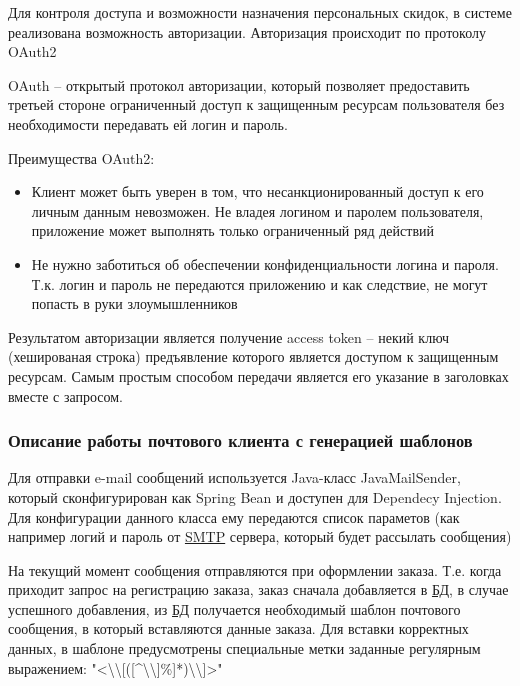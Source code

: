 Для контроля доступа и возможности назначения персональных скидок, в системе реализована возможность авторизации. Авторизация происходит по протоколу OAuth2


OAuth – открытый протокол авторизации, который позволяет предоставить третьей стороне ограниченный доступ к защищенным ресурсам пользователя без необходимости передавать ей логин и пароль.

Преимущества OAuth2:
\begin{itemize}
    \item Клиент может быть уверен в том, что несанкционированный доступ к его личным данным невозможен.
    Не владея логином и паролем пользователя, приложение может выполнять только ограниченный ряд действий
    \item Не нужно заботиться об обеспечении конфиденциальности логина и пароля.
    Т.к. логин и пароль не передаются приложению и как следствие, не могут попасть в руки злоумышленников
\end{itemize}

Результатом авторизации является получение access token – некий ключ (хешированая строка) предъявление которого является доступом к защищенным ресурсам.
Самым простым способом передачи является его указание в заголовках вместе с запросом.

\subsubsection{Описание работы почтового клиента с генерацией шаблонов}\indent

Для отправки e-mail сообщений используется Java-класс JavaMailSender, который сконфигурирован как Spring Bean и доступен для Dependecy Injection.
Для конфигурации данного класса ему передаются список параметов (как например логий и пароль от \hyperlink{gloss:smtp}{SMTP} сервера, который будет рассылать сообщения)

На текущий момент сообщения отправляются при оформлении заказа.
Т.е. когда приходит запрос на регистрацию заказа, заказ сначала добавляется в \hyperlink{gloss:db}{БД}, в случае успешного добавления, из \hyperlink{gloss:db}{БД} получается необходимый шаблон почтового сообщения, в который вставляются данные заказа.
Для вставки корректных данных, в шаблоне предусмотрены специальные метки заданные регулярным выражением: "<\textbackslash\textbackslash[([\textasciicircum\textbackslash\textbackslash]\%]*)\textbackslash\textbackslash]>"

